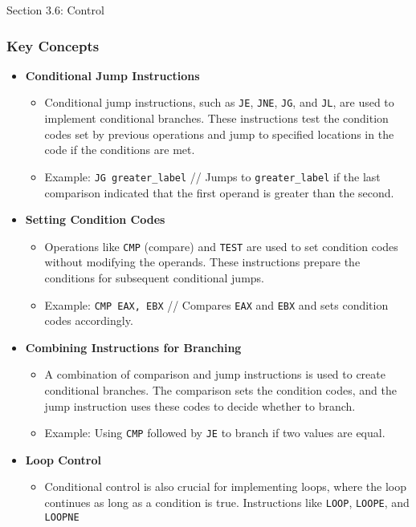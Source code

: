 \begin{notes}{Section 3.6: Control}
    \subsubsection*{Key Concepts}
    
    \begin{itemize}
        \item \textbf{Conditional Jump Instructions}
        \begin{itemize}
            \item Conditional jump instructions, such as \texttt{JE}, \texttt{JNE}, \texttt{JG}, and \texttt{JL}, are used to implement conditional branches. These instructions test the condition 
            codes set by previous operations and jump to specified locations in the code if the conditions are met.
            \item Example: \texttt{JG greater\_label} // Jumps to \texttt{greater\_label} if the last comparison indicated that the first operand is greater than the second.
        \end{itemize}
        \item \textbf{Setting Condition Codes}
        \begin{itemize}
            \item Operations like \texttt{CMP} (compare) and \texttt{TEST} are used to set condition codes without modifying the operands. These instructions prepare the conditions for subsequent 
            conditional jumps.
            \item Example: \texttt{CMP EAX, EBX} // Compares \texttt{EAX} and \texttt{EBX} and sets condition codes accordingly.
        \end{itemize}
        \item \textbf{Combining Instructions for Branching}
        \begin{itemize}
            \item A combination of comparison and jump instructions is used to create conditional branches. The comparison sets the condition codes, and the jump instruction uses these codes to decide 
            whether to branch.
            \item Example: Using \texttt{CMP} followed by \texttt{JE} to branch if two values are equal.
        \end{itemize}
        \item \textbf{Loop Control}
        \begin{itemize}
            \item Conditional control is also crucial for implementing loops, where the loop continues as long as a condition is true. Instructions like \texttt{LOOP}, \texttt{LOOPE}, and \texttt{LOOPNE} 

\end{itemize}
\end{itemize}
\end{notes}
